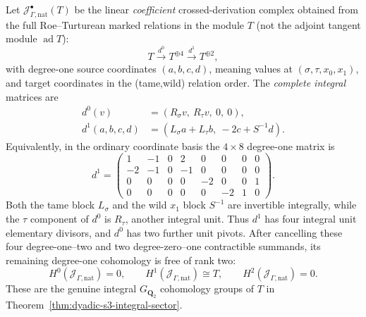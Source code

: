 \begin{theorem}
\label{thm:dyadic-s3-natural-full-marked-matrix}
Let
$\mathcal J^\bullet_{\Gamma,\mathrm{nat}}(T)$
be the linear \emph{coefficient}
crossed-derivation complex obtained
from the full Roe--Turturean
marked relations in the module $T$
(not the adjoint tangent module
$\operatorname{ad}T$):
\begin{equation}\label{eq:dyadic-s3-natural-three-term-complex}
T\xrightarrow{d^0}T^{\oplus4}
\xrightarrow{d^1}T^{\oplus2},
\end{equation}
with degree-one source coordinates
$(a,b,c,d)$, meaning values at
$(\sigma,\tau,x_0,x_1)$, and target
coordinates in the (tame,wild)
relation order.  The \emph{complete
integral} matrices are
\begin{equation}\label{eq:dyadic-s3-natural-differentials}
\boxed{
\begin{aligned}
d^0(v)&=(R_\sigma v,\ R_\tau v,\ 0,\ 0),
\\
d^1(a,b,c,d)
&=(L_\sigma a+L_\tau b,\ -2c+S^{-1}d).
\end{aligned}}
\end{equation}
Equivalently, in the ordinary
coordinate basis the $4\times8$
degree-one matrix is
\begin{equation}\label{eq:dyadic-s3-natural-4x8-jacobian}
\boxed{\quad
d^1=
\begin{pmatrix}
 1&-1&0&2&0&0&0&0\\
 -2&-1&0&-1&0&0&0&0\\
 0&0&0&0&-2&0&0&1\\
 0&0&0&0&0&-2&1&0
\end{pmatrix}.
\quad}
\end{equation}
Both the tame block $L_\sigma$
and the wild $x_1$ block
$S^{-1}$ are invertible
integrally, while the $\tau$
component of $d^0$ is
$R_\tau$, another integral unit.
Thus $d^1$ has four integral
unit elementary divisors,
and $d^0$ has two further
unit pivots.  After cancelling
these four degree-one--two and
two degree-zero--one contractible
summands, its remaining degree-one
cohomology is free of rank two:
\begin{equation}\label{eq:dyadic-s3-natural-marked-cohomology}
H^0(\mathcal J_{\Gamma,\mathrm{nat}})=0,
\qquad
H^1(\mathcal J_{\Gamma,\mathrm{nat}})
\cong T,\qquad
H^2(\mathcal J_{\Gamma,\mathrm{nat}})=0.
\end{equation}
These are the genuine integral
$G_{\mathbf Q_2}$ cohomology groups
of $T$ in
Theorem~\ref{thm:dyadic-s3-integral-sector}.
\end{theorem}

